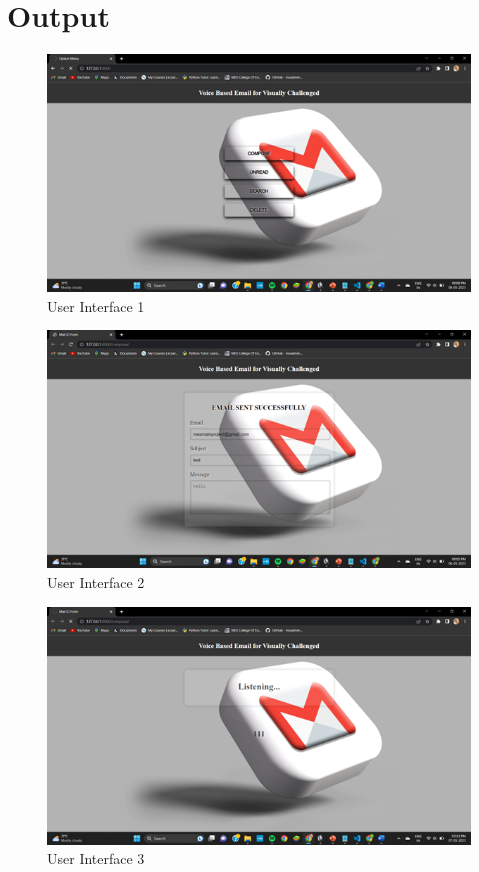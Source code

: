 \documentclass[12pt]{report}
\begin{document}
\chapter{Output}
\begin{figure}[htbp]
\begin{center}
  \includegraphics[scale=0.90]{1.png}
  \caption{User Interface 1} 
   \label{fig:is}
\end{center}
\end{figure}
\begin{figure}[htbp]
\begin{center}
  \includegraphics[scale=0.75]{2.png}
  \caption{User Interface 2} 

   \label{fig:is}
\end{center}
\end{figure}
\begin{figure}[htbp]
\begin{center}
  \includegraphics[scale=0.75]{3.png}
  \caption{User Interface 3} 
   \label{fig:is}
\end{center}
\end{figure}
\end{document}
